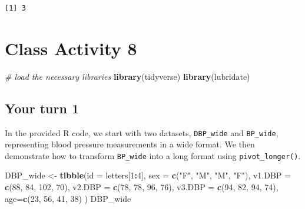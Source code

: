 \documentclass[
]{book}
\newenvironment{Shaded}{\begin{snugshade}}{\end{snugshade}}
\newcommand{\AttributeTok}[1]{\textcolor[rgb]{0.13,0.29,0.53}{#1}}
\newcommand{\CommentTok}[1]{\textcolor[rgb]{0.56,0.35,0.01}{\textit{#1}}}
\newcommand{\DecValTok}[1]{\textcolor[rgb]{0.00,0.00,0.81}{#1}}
\newcommand{\FunctionTok}[1]{\textcolor[rgb]{0.13,0.29,0.53}{\textbf{#1}}}
\newcommand{\NormalTok}[1]{#1}
\newcommand{\OtherTok}[1]{\textcolor[rgb]{0.56,0.35,0.01}{#1}}
\newcommand{\SpecialCharTok}[1]{\textcolor[rgb]{0.81,0.36,0.00}{\textbf{#1}}}
\newcommand{\StringTok}[1]{\textcolor[rgb]{0.31,0.60,0.02}{#1}}
\begin{document}
\begin{verbatim}
[1] 3
\end{verbatim}

\hypertarget{class-activity-8}{%
\chapter{Class Activity 8}\label{class-activity-8}}

\begin{Shaded}
\begin{Highlighting}[]
\CommentTok{\# load the necessary libraries}
\FunctionTok{library}\NormalTok{(tidyverse)}
\FunctionTok{library}\NormalTok{(lubridate)}
\end{Highlighting}
\end{Shaded}

\hypertarget{your-turn-1-1}{%
\section{Your turn 1}\label{your-turn-1-1}}

In the provided R code, we start with two datasets, \texttt{DBP\_wide} and \texttt{BP\_wide}, representing blood pressure measurements in a wide format. We then demonstrate how to transform \texttt{BP\_wide} into a long format using \texttt{pivot\_longer()}.

\begin{Shaded}
\begin{Highlighting}[]
\NormalTok{DBP\_wide }\OtherTok{\textless{}{-}} \FunctionTok{tibble}\NormalTok{(}\AttributeTok{id =}\NormalTok{ letters[}\DecValTok{1}\SpecialCharTok{:}\DecValTok{4}\NormalTok{],}
 \AttributeTok{sex =} \FunctionTok{c}\NormalTok{(}\StringTok{"F"}\NormalTok{, }\StringTok{"M"}\NormalTok{, }\StringTok{"M"}\NormalTok{, }\StringTok{"F"}\NormalTok{),}
 \AttributeTok{v1.DBP =} \FunctionTok{c}\NormalTok{(}\DecValTok{88}\NormalTok{, }\DecValTok{84}\NormalTok{, }\DecValTok{102}\NormalTok{, }\DecValTok{70}\NormalTok{),}
 \AttributeTok{v2.DBP =} \FunctionTok{c}\NormalTok{(}\DecValTok{78}\NormalTok{, }\DecValTok{78}\NormalTok{, }\DecValTok{96}\NormalTok{, }\DecValTok{76}\NormalTok{),}
 \AttributeTok{v3.DBP =} \FunctionTok{c}\NormalTok{(}\DecValTok{94}\NormalTok{, }\DecValTok{82}\NormalTok{, }\DecValTok{94}\NormalTok{, }\DecValTok{74}\NormalTok{),}
 \AttributeTok{age=}\FunctionTok{c}\NormalTok{(}\DecValTok{23}\NormalTok{, }\DecValTok{56}\NormalTok{, }\DecValTok{41}\NormalTok{, }\DecValTok{38}\NormalTok{)}
\NormalTok{ )}
\NormalTok{DBP\_wide}
\end{Highlighting}
\end{Shaded}
\end{document}
